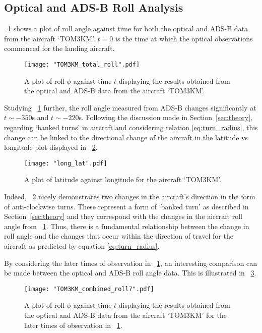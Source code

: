 \documentclass[11pt]{article}
\newcommand{\figref}[2][\figurename~]{#1\ref{#2}}
\newcommand{\secref}[2][Section~]{#1\ref{#2}}
\begin{document}
\subsection{Optical and ADS-B Roll Analysis}
\label{ssec:ssec:roll-analysis}

\figref{fig:total_roll} shows a plot of roll angle against time for both the optical and ADS-B data from the aircraft `TOM3KM'. $t = 0$ is the time at which the optical observations commenced for the landing aircraft.


\begin{figure}[h]
\centering
\texttt{[image: "TOM3KM\_total\_roll".pdf]}
\caption{A plot of roll $\phi$ against time $t$ displaying the results obtained from the optical and ADS-B data from the aircraft `TOM3KM'.}
\label{fig:total_roll}
\end{figure}

Studying \figref{fig:total_roll} further, the roll angle measured from ADS-B changes significantly at $t \sim -350$s and $t \sim -220$s. Following the discussion made in \secref{sec:theory}, regarding `banked turns' in aircraft and considering relation \eqref{eq:turn_radius}, this change can be linked to the directional change of the aircraft in the latitude vs longitude plot displayed in \figref{fig:long_lat}.

\begin{figure}[h]
\centering
\texttt{[image: "long\_lat".pdf]}
\caption{A plot of latitude against longitude for the aircraft `TOM3KM'.}
\label{fig:long_lat}
\end{figure}

Indeed, \figref{fig:long_lat} nicely demonstrates two changes in the aircraft's direction in the form of anti-clockwise turns. These represent a form of `banked turn' as described in \secref{sec:theory} and they correspond with the changes in the aircraft roll angle from \figref{fig:total_roll}. Thus, there is a fundamental relationship between the change in roll angle and the changes that occur within the direction of travel for the aircraft as predicted by equation \eqref{eq:turn_radius}.

By considering the later times of observation in \figref{fig:total_roll}, an interesting comparison can be made between the optical and ADS-B roll angle data. This is illustrated in \figref{fig:roll}.

\begin{figure}[h]
\centering
\texttt{[image: "TOM3KM\_combined\_roll7".pdf]}
\caption{A plot of roll $\phi$ against time $t$ displaying the results obtained from the optical and ADS-B data from the aircraft `TOM3KM' for the later times of observation in \figref{fig:total_roll}.}
\label{fig:roll}
\end{figure}
\end{document}
